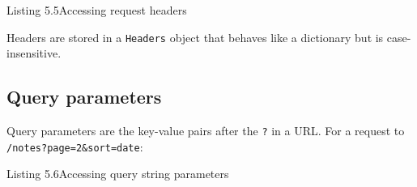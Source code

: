 \begin{codeboxcap}[short]{\textcolor{accent}{Listing 5.5}\enspace Accessing request headers}

\begin{Shaded}
\begin{Highlighting}[]
\OperatorTok{=}\NormalTok{)}
\OperatorTok{=}\NormalTok{)}

    \NormalTok{(}\SpecialCharTok{\{}\SpecialCharTok{\}}\SpecialStringTok{: }\SpecialCharTok{\{}\SpecialCharTok{\}}\NormalTok{)}
\end{Highlighting}
\end{Shaded}

\end{codeboxcap}

\noindent{}Headers are stored in a \texttt{Headers} object that behaves like a dictionary but is case-insensitive.

\subsection*{Query parameters}\label{05-internal-request-execution:query-parameters}

Query parameters are the key-value pairs after the \texttt{?} in a URL. For a request to \texttt{/}\allowbreak{}\texttt{notes?}\allowbreak{}\texttt{page=}\allowbreak{}\texttt{2\&}\allowbreak{}\texttt{sort=}\allowbreak{}\texttt{date}:

\begin{codeboxcap}[short]{\textcolor{accent}{Listing 5.6}\enspace Accessing query string parameters}

\begin{Shaded}
\begin{Highlighting}[]
\OperatorTok{=}\OperatorTok{=}\NormalTok{, }\OperatorTok{=}\NormalTok{)    }
\OperatorTok{=}\OperatorTok{=}\NormalTok{)          }
\OperatorTok{=}\OperatorTok{=}\NormalTok{, }\OperatorTok{=}\NormalTok{)   }
\end{Highlighting}
\end{Shaded}

\end{codeboxcap}

